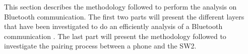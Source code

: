 This section describes the methodology followed to perform the analysis on Bluetooth communication. The first two parts will present the different layers that have been investigated to do an efficiently analysis of a Bluetooth communication . The last part will present the methodology followed to investigate the pairing process between a phone and the SW2.
	